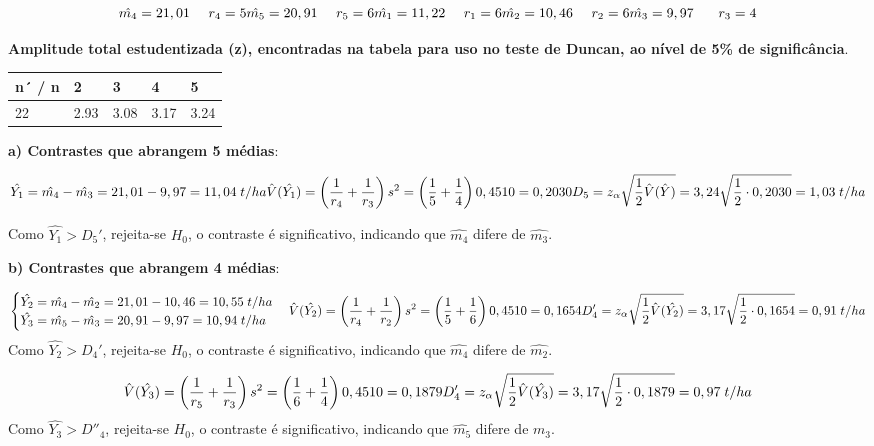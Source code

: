 \documentclass[
]{book}
\begin{document}
\[
\hat{m_4}=21,01 \:\:\:\:\:\: r_4=5\\
\hat{m_5}=20,91 \:\:\:\:\:\: r_5=6\\
\hat{m_1}=11,22 \:\:\:\:\:\: r_1=6\\
\hat{m_2}=10,46 \:\:\:\:\:\: r_2=6\\
\hat{m_3}=9,97 \:\:\:\:\:\:\:\: r_3=4\\
\]

\textbf{Amplitude total estudentizada (z), encontradas na tabela para uso no teste de Duncan, ao nível de 5\% de significância}.

\begin{longtable}[]{@{}lllll@{}}
\toprule
n´ / n & 2 & 3 & 4 & 5\tabularnewline
\midrule
\endhead
22 & 2.93 & 3.08 & 3.17 & 3.24\tabularnewline
\bottomrule
\end{longtable}

\textbf{a) Contrastes que abrangem 5 médias}:

\[
\hat{Y_1}=\hat{m_4}-\hat{m_3} = 21,01-9,97 = 11,04\;t/ha \\
\hat{V}(\hat{Y_1})= \left( \frac{1}{r_4} + \frac{1}{r_3}\right)s^2 = \left( \frac{1}{5} + \frac{1}{4}\right)0,4510 = 0,2030\\
D_5 = z_\alpha \sqrt{\frac{1}{2}\hat{V}(\hat{Y})}= 3,24\sqrt{\frac{1}{2}\cdot0,2030} = 1,03\; t/ha
\]

Como \(\hat{Y_1} > D_5'\), rejeita-se \(H_0\), o contraste é significativo, indicando que \(\hat{m_4}\) difere de \(\hat{m_3}\).

\textbf{b) Contrastes que abrangem 4 médias}:

\[
\begin{cases} \hat{Y_2}=\hat{m_4}-\hat{m_2} = 21,01-10,46 = 10,55\;t/ha \\
\hat{Y_3}=\hat{m_5}-\hat{m_3} = 20,91-9,97 = 10,94\;t/ha \end{cases} \\
\hat{V}(\hat{Y_2})= \left( \frac{1}{r_4} + \frac{1}{r_2}\right)s^2 = \left( \frac{1}{5} + \frac{1}{6}\right)0,4510 = 0,1654\\
D_4' = z_\alpha \sqrt{\frac{1}{2}\hat{V}(\hat{Y_2})}= 3,17\sqrt{\frac{1}{2}\cdot0,1654} = 0,91\; t/ha \\
\]
Como \(\hat{Y_2} > D_4'\), rejeita-se \(H_0\), o contraste é significativo, indicando que \(\hat{m_4}\) difere de \(\hat{m_2}\).

\[
\hat{V}(\hat{Y_3})= \left( \frac{1}{r_5} + \frac{1}{r_3}\right)s^2 = \left( \frac{1}{6} + \frac{1}{4}\right)0,4510 = 0,1879\\
D'_4 = z_\alpha \sqrt{\frac{1}{2}\hat{V}(\hat{Y_3})}= 3,17\sqrt{\frac{1}{2}\cdot0,1879} = 0,97\; t/ha \\
\]
Como \(\hat{Y_3} > D''_4\), rejeita-se \(H_0\), o contraste é significativo, indicando que \(\hat{m_5}\) difere de \(\hat{m_3}\).
\end{document}
